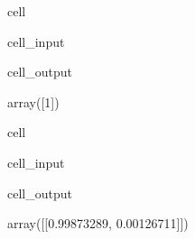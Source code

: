 \documentclass[letterpaper,10pt,english]{jupyterBook}
\begin{document}
\begin{sphinxuseclass}{cell}\begin{sphinxVerbatimInput}

\begin{sphinxuseclass}{cell_input}
\begin{sphinxVerbatim}[commandchars=\\\{\}]
\PYG{p}{[}
    \PYG{p}{[}\PYG{p}{]}
\PYG{p}{]}
\end{sphinxVerbatim}

\end{sphinxuseclass}\end{sphinxVerbatimInput}
\begin{sphinxVerbatimOutput}

\begin{sphinxuseclass}{cell_output}
\begin{sphinxVerbatim}[commandchars=\\\{\}]
array([1])
\end{sphinxVerbatim}

\end{sphinxuseclass}\end{sphinxVerbatimOutput}

\end{sphinxuseclass}
\begin{sphinxuseclass}{cell}\begin{sphinxVerbatimInput}

\begin{sphinxuseclass}{cell_input}
\begin{sphinxVerbatim}[commandchars=\\\{\}]
\PYG{p}{[}
    \PYG{p}{[}\PYG{p}{]}
\PYG{p}{]}
\end{sphinxVerbatim}

\end{sphinxuseclass}\end{sphinxVerbatimInput}
\begin{sphinxVerbatimOutput}

\begin{sphinxuseclass}{cell_output}
\begin{sphinxVerbatim}[commandchars=\\\{\}]
array([[0.99873289, 0.00126711]])
\end{sphinxVerbatim}

\end{sphinxuseclass}\end{sphinxVerbatimOutput}

\end{sphinxuseclass}
\end{document}
